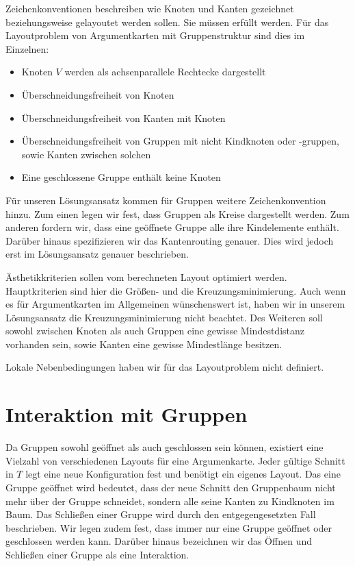 Zeichenkonventionen beschreiben wie Knoten und Kanten gezeichnet beziehungsweise gelayoutet werden sollen. Sie müssen erfüllt werden.
Für das Layoutproblem von Argumentkarten mit Gruppenstruktur sind dies im Einzelnen:
\begin{itemize}
\item Knoten $V$ werden als achsenparallele Rechtecke dargestellt
\item Überschneidungsfreiheit von Knoten
\item Überschneidungsfreiheit von Kanten mit Knoten
\item Überschneidungsfreiheit von Gruppen mit nicht Kindknoten oder -gruppen, sowie Kanten zwischen solchen
\item Eine geschlossene Gruppe enthält keine Knoten
\end{itemize}

Für unseren Lösungsansatz kommen für Gruppen weitere Zeichenkonvention hinzu. Zum einen legen wir fest, dass Gruppen
als Kreise dargestellt werden. Zum anderen fordern wir, dass eine geöffnete Gruppe alle ihre Kindelemente enthält. 
Darüber hinaus spezifizieren wir das Kantenrouting genauer. Dies wird jedoch erst im Lösungsansatz genauer beschrieben.

Ästhetikkriterien sollen vom berechneten Layout optimiert werden. Hauptkriterien sind hier die Größen- und die Kreuzungsminimierung.
Auch wenn es für Argumentkarten im Allgemeinen wünschenswert ist, haben wir in unserem Lösungsansatz die Kreuzungsminimierung nicht beachtet.
Des Weiteren soll sowohl zwischen Knoten als auch Gruppen eine gewisse Mindestdistanz vorhanden sein, sowie Kanten eine gewisse Mindestlänge besitzen.

Lokale Nebenbedingungen haben wir für das Layoutproblem nicht definiert.


\section{Interaktion mit Gruppen}
Da Gruppen sowohl geöffnet als auch geschlossen sein können, existiert eine Vielzahl von verschiedenen Layouts für eine Argumenkarte.
Jeder gültige Schnitt in $T$ legt eine neue Konfiguration fest und benötigt ein eigenes Layout. 
Das eine Gruppe geöffnet wird bedeutet, dass der neue Schnitt den Gruppenbaum nicht mehr über der Gruppe schneidet, sondern alle seine Kanten zu Kindknoten im Baum.
Das Schließen einer Gruppe wird durch den entgegengesetzten Fall beschrieben. Wir legen zudem fest, dass immer nur eine Gruppe geöffnet oder geschlossen werden kann. Darüber hinaus bezeichnen wir das Öffnen und Schließen einer Gruppe als eine Interaktion.

